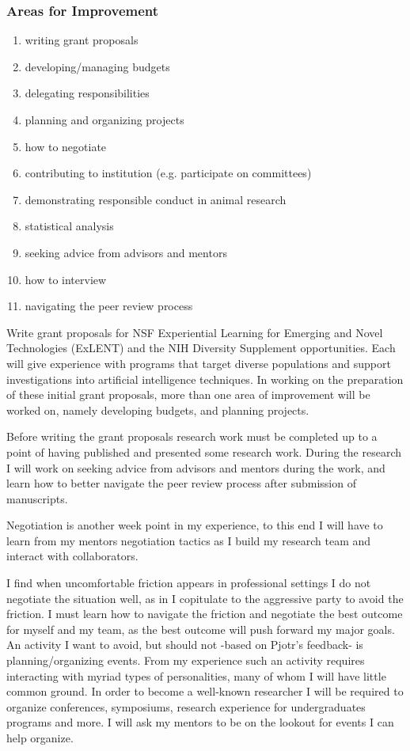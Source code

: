 \subsubsection{Areas for Improvement}
\begin{enumerate}[noitemsep]
    \item writing grant proposals
    \item developing/managing budgets
    \item delegating responsibilities
    \item planning and organizing projects
    \item how to negotiate
    \item contributing to institution (e.g. participate on committees)
    \item demonstrating responsible conduct in animal research
    \item statistical analysis
    \item seeking advice from advisors and mentors
    \item how to interview
    \item navigating the peer review process
\end{enumerate}



Write grant proposals for NSF Experiential Learning for Emerging and Novel Technologies (ExLENT) and the NIH Diversity Supplement opportunities.
Each will give experience with programs that target diverse populations and support investigations into artificial intelligence techniques.
In working on the preparation of these initial grant proposals, more than one area of improvement will be worked on, namely developing budgets, and planning projects.

Before writing the grant proposals research work must be completed up to a point of having published and presented some research work.
During the research I will work on seeking advice from advisors and mentors during the work, and learn how to better navigate the peer review process after submission of manuscripts.


Negotiation is another week point in my experience, to this end I will have to learn from my mentors negotiation tactics as I build my research team and interact with collaborators.

I find when uncomfortable friction appears in professional settings I do not negotiate the situation well, as in I copitulate to the aggressive party to avoid the friction.
I must learn how to navigate the friction and negotiate the best outcome for myself and my team, as the best outcome will push forward my major goals.
An activity I want to avoid, but should not -based on Pjotr's feedback- is planning/organizing events.
From my experience such an activity requires interacting with myriad types of personalities, many of whom I will have little common ground.
In order to become a well-known researcher I will be required to organize conferences, symposiums, research experience for undergraduates programs and more.
I will ask my mentors to be on the lookout for events I can help organize. 

